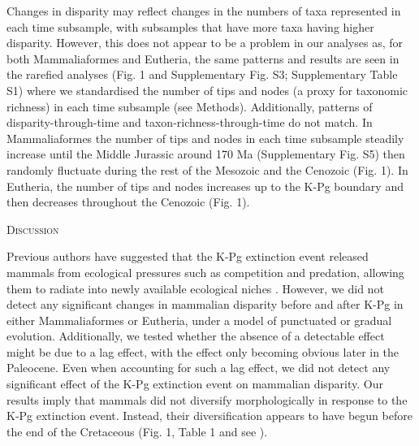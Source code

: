 \documentclass[12pt,letterpaper]{article}
\renewcommand{\section}[1]{%
\bigskip
\begin{center}
\begin{Large}
\normalfont\scshape #1
\medskip
\end{Large}
\end{center}}
\begin{document}
Changes in disparity may reflect changes in the numbers of taxa represented in each time subsample, with subsamples that have more taxa having higher disparity. 
However, this does not appear to be a problem in our analyses as, for both Mammaliaformes and Eutheria, the same patterns and results are seen in the rarefied analyses (Fig. 1 and Supplementary Fig. S3; Supplementary Table S1) where we standardised the number of tips and nodes (a proxy for taxonomic richness) in each time subsample (see Methods).
Additionally, patterns of disparity-through-time and taxon-richness-through-time do not match.
In Mammaliaformes the number of tips and nodes in each time subsample steadily increase until the Middle Jurassic around 170 Ma (Supplementary Fig. S5) then randomly fluctuate during the rest of the Mesozoic and the Cenozoic (Fig. 1).
In Eutheria, the number of tips and nodes increases up to the K-Pg boundary and then decreases throughout the Cenozoic (Fig. 1).

%
%

\section{Discussion}
Previous authors have suggested that the K-Pg extinction event released mammals from ecological pressures such as competition and predation, allowing them to radiate into newly available ecological niches \cite{archibald2011extinction,OLeary08022013,Lovergrove,Slater2012MEE}.
However, we did not detect any significant changes in mammalian disparity before and after K-Pg in either Mammaliaformes or Eutheria, under a model of punctuated or gradual evolution.
Additionally, we tested whether the absence of a detectable effect might be due to a lag effect, with the effect only becoming obvious later in the Paleocene.
Even when accounting for such a lag effect, we did not detect any significant effect of the K-Pg extinction event on mammalian disparity.
Our results imply that mammals did not diversify morphologically in response to the K-Pg extinction event.
Instead, their diversification appears to have begun before the end of the Cretaceous (Fig. 1, Table 1 and see \cite{meredithimpacts2011,dosReis2014,Close2015,Lee2015R759}).
\end{document}
